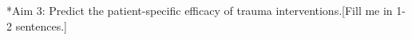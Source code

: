 \documentclass[12pt]{article}
\makeatletter
\renewcommand\subsubsection{\@startsection
	{subsubsection}{2}{0mm}
	{-0.05in}
	{-0.5\baselineskip}
	{\normalfont\normalsize\bfseries}}
\makeatother
\begin{document}
\subsubsection*{Aim 3: Predict the patient-specific efficacy of trauma interventions.}[Fill me in 1-2 sentences.]

\clearpage

%
%
\end{document}
